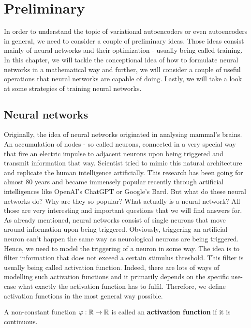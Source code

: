 
\chapter{Preliminary}
In order to understand the topic of variational autoencoders or even autoencoders in general, we need to consider a couple of preliminary ideas. Those ideas consist mainly of neural networks and their optimization - usually being called training. In this chapter, we will tackle the conceptional idea of how to formulate neural networks in a mathematical way and further, we will consider a couple of useful operations that neural networks are capable of doing. Lastly, we will take a look at some strategies of training neural networks.

\section{Neural networks}
Originally, the idea of neural networks originated in analysing mammal's brains. An accumulation of nodes - so called neurons, connected in a very special way that fire an electric impulse to adjacent neurons upon being triggered and transmit information that way. Scientist tried to mimic this natural architecture and replicate the human intelligence artificially. This research has been going for almost 80 years and became immensely popular recently through artificial intelligences like OpenAI's ChatGPT or Google's Bard. But what do these neural networks do? Why are they so popular? What actually is a neural network? All those are very interesting and important questions that we will find answers for.\\
As already mentioned, neural networks consist of single neurons that move around information upon being \glqq triggered\grqq{}. Obviously, triggering an artificial neuron can't happen the same way as neurological neurons are being triggered. Hence, we need to model the triggering of a neuron in some way. The idea is to filter information that does not exceed a certain stimulus threshold. This filter is usually being called activation function. Indeed, there are lots of ways of modelling such activation functions and it primarily depends on the specific use-case what exactly the activation function has to fulfil. Therefore, we define activation functions in the most general way possible.

\begin{definition}
A non-constant function $\operatorname{\varphi}: \operatorname{\mathbb{R}} \to \operatorname{\mathbb{R}}$ is called an \textbf{activation function} if it is continuous.
\end{definition}

